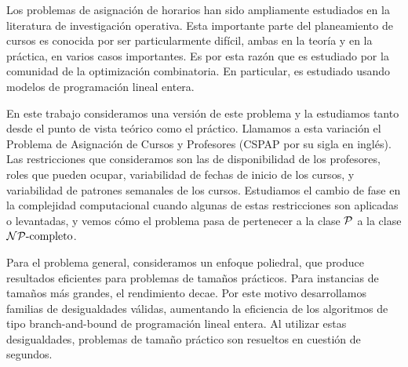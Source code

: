 Los problemas de asignación de horarios han sido ampliamente estudiados en la literatura de investigación operativa. Esta importante parte del planeamiento de cursos es conocida por ser particularmente difícil, ambas en la teoría y en la práctica, en varios casos importantes. Es por esta razón que es estudiado por la comunidad de la optimización combinatoria. En particular, es estudiado usando modelos de programación lineal entera.

En este trabajo consideramos una versión de este problema y la estudiamos tanto desde el punto de vista teórico como el práctico. Llamamos a esta variación el Problema de Asignación de Cursos y Profesores (CSPAP por su sigla en inglés). Las restricciones que consideramos son las de disponibilidad de los profesores, roles que pueden ocupar, variabilidad de fechas de inicio de los cursos, y variabilidad de patrones semanales de los cursos. Estudiamos el cambio de fase en la complejidad computacional cuando algunas de estas restricciones son aplicadas o levantadas, y vemos cómo el problema pasa de pertenecer a la clase $\mathcal{P}$ a la clase $\mathcal{NP}{\text{-completo}}$.

Para el problema general, consideramos un enfoque poliedral, que produce resultados eficientes para problemas de tamaños prácticos. Para instancias de tamaños más grandes, el rendimiento decae. Por este motivo desarrollamos familias de desigualdades válidas, aumentando la eficiencia de los algoritmos de tipo branch-and-bound de programación lineal entera. Al utilizar estas desigualdades, problemas de tamaño práctico son resueltos en cuestión de segundos.
